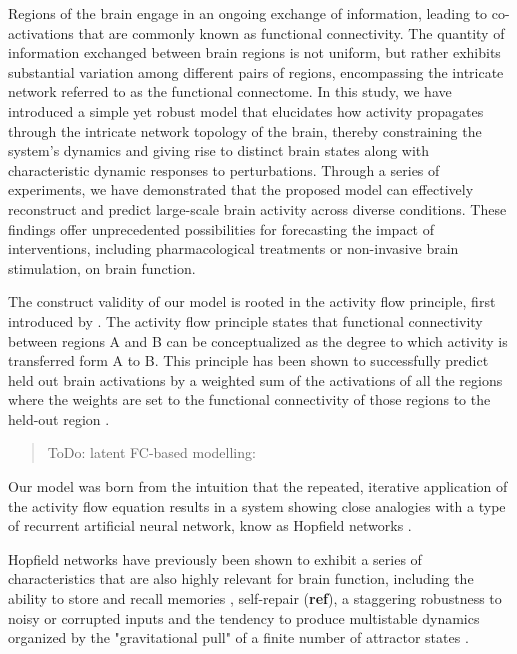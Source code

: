 \documentclass{article}
\begin{document}
Regions of the brain engage in an ongoing exchange of information, leading to co-activations that are commonly known as
functional connectivity. The quantity of information exchanged between brain regions is not uniform, but rather exhibits
substantial variation among different pairs of regions, encompassing the intricate network referred to as the functional
connectome. In this study, we have introduced a simple yet robust model that elucidates how activity propagates through
the intricate network topology of the brain, thereby constraining the system's dynamics and giving rise to distinct
brain states along with characteristic dynamic responses to perturbations. Through a series of experiments, we have
demonstrated that the proposed model can effectively reconstruct and predict large-scale brain activity across diverse
conditions. These findings offer unprecedented possibilities for forecasting the impact of interventions, including
pharmacological treatments or non-invasive brain stimulation, on brain function.

The construct validity of our model is rooted in the activity flow principle, first introduced by
\citep{cole2016activity}. The activity flow principle states that functional connectivity between regions A and B can
be conceptualized as the degree to which activity is transferred form A to B. This principle has been shown to
successfully predict held out brain activations by a weighted sum of the activations of all the regions where the
weights are set to the functional connectivity of those regions to the held-out region
\citep{cole2016activity, ito2017cognitive, mill2022network, hearne2021activity, chen2018human}.

\begin{quote}
ToDo: latent FC-based modelling: \cite{McCormick_2022}
\end{quote}

Our model was born from the intuition that the repeated, iterative application of the activity flow equation results in
a system showing close analogies with a type of recurrent artificial neural network, know as Hopfield networks
\citep{hopfield1982neural}.

Hopfield networks have previously been shown to exhibit a series of characteristics that are also highly relevant for
brain function, including the ability to store and recall memories \citep{hopfield1982neural}, self-repair (\textbf{ref}),
a staggering robustness to noisy or corrupted inputs \citep{hertz1991introduction} and the tendency to produce
multistable dynamics organized by the "gravitational pull" of a finite number of attractor states
\citep{khona2022attractor}.
\end{document}
